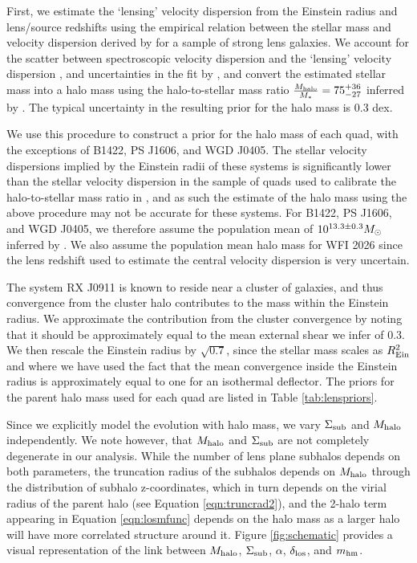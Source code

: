 First, we estimate the `lensing' velocity dispersion from the Einstein radius and lens/source redshifts using the empirical relation between the stellar mass and velocity dispersion derived by \citet{Auger++10} for a sample of strong lens galaxies. We account for the scatter between spectroscopic velocity dispersion and the `lensing' velocity dispersion \citep{Treu++06}, and uncertainties in the fit by \citet{Auger++10}, and convert the estimated stellar mass into a halo mass using the halo-to-stellar mass ratio $\frac{M_{\rm{halo}}}{M_{*}} = 75_{-27}^{+36}$ inferred by \citet{Lagattuta++10}. The typical uncertainty in the resulting prior for the halo mass is 0.3 dex. 

We use this procedure to construct a prior for the halo mass of each quad, with the exceptions of B1422, PS J1606, and WGD J0405. The stellar velocity dispersions implied by the Einstein radii of these systems is significantly lower than the stellar velocity dispersion in the sample of quads used to calibrate the halo-to-stellar mass ratio in \citet{Lagattuta++10}, and as such the estimate of the halo mass using the above procedure may not be accurate for these systems. For B1422, PS J1606, and WGD J0405, we therefore assume the population mean of $10^{13.3 \pm 0.3} {M_{\odot}}$ inferred by \citet{Lagattuta++10}. We also assume the population mean halo mass for WFI 2026 since the lens redshift used to estimate the central velocity dispersion is very uncertain. 

The system RX J0911 is known to reside near a cluster of galaxies, and thus convergence from the cluster halo contributes to the mass within the Einstein radius. We approximate the contribution from the cluster convergence by noting that it should be approximately equal to the mean external shear we infer of 0.3. We then rescale the Einstein radius by $\sqrt{0.7}$, since the stellar mass scales as $R_{\rm{Ein}}^2$ and where we have used the fact that the mean convergence inside the Einstein radius is approximately equal to one for an isothermal deflector. The priors for the parent halo mass used for each quad are listed in Table \ref{tab:lenspriors}.  

Since we explicitly model the evolution with halo mass, we vary $\Sigma_{\rm{sub}}$ and $M_{\rm{halo}}$ independently. We note however, that $M_{\rm{halo}}$ and $\Sigma_{\rm{sub}}$ are not completely degenerate in our analysis. While the number of lens plane subhalos depends on both parameters, the truncation radius of the subhalos depends on $M_{\rm{halo}}$ through the distribution of subhalo z-coordinates, which in turn depends on the virial radius of the parent halo (see Equation \ref{eqn:truncrad2}), and the 2-halo term appearing in Equation \ref{eqn:losmfunc} depends on the halo mass as a larger halo will have more correlated structure around it. Figure \ref{fig:schematic} provides a visual representation of the link between $M_{\rm{halo}}$, $\Sigma_{\rm{sub}}$, $\alpha$, $\delta_{\rm{los}}$, and ${m_{\rm{hm}}}$. 

